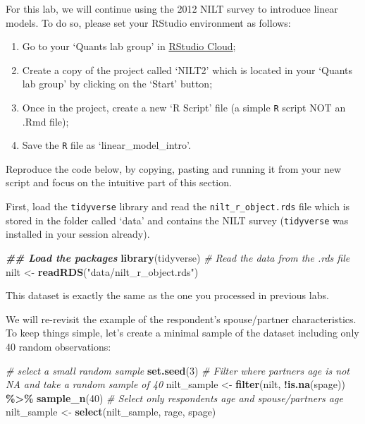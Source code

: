 \documentclass[
]{book}
\newenvironment{Shaded}{\begin{snugshade}}{\end{snugshade}}
\newcommand{\CommentTok}[1]{\textcolor[rgb]{0.56,0.35,0.01}{\textit{#1}}}
\newcommand{\DecValTok}[1]{\textcolor[rgb]{0.00,0.00,0.81}{#1}}
\newcommand{\DocumentationTok}[1]{\textcolor[rgb]{0.56,0.35,0.01}{\textbf{\textit{#1}}}}
\newcommand{\FunctionTok}[1]{\textcolor[rgb]{0.13,0.29,0.53}{\textbf{#1}}}
\newcommand{\NormalTok}[1]{#1}
\newcommand{\OtherTok}[1]{\textcolor[rgb]{0.56,0.35,0.01}{#1}}
\newcommand{\SpecialCharTok}[1]{\textcolor[rgb]{0.81,0.36,0.00}{\textbf{#1}}}
\newcommand{\StringTok}[1]{\textcolor[rgb]{0.31,0.60,0.02}{#1}}
\providecommand{\tightlist}{%
  \setlength{\itemsep}{0pt}\setlength{\parskip}{0pt}}
\begin{document}
For this lab, we will continue using the 2012 NILT survey to introduce linear models. To do so, please set your RStudio environment as follows:

\begin{enumerate}
\def\labelenumi{\arabic{enumi}.}
\tightlist
\item
  Go to your `Quants lab group' in \href{https://rstudio.cloud/}{RStudio Cloud};
\item
  Create a copy of the project called `NILT2' which is located in your `Quants lab group' by clicking on the `Start' button;
\item
  Once in the project, create a new `R Script' file (a simple \texttt{R} script NOT an .Rmd file);
\item
  Save the \texttt{R} file as `linear\_model\_intro'.
\end{enumerate}

Reproduce the code below, by copying, pasting and running it from your new script and focus on the intuitive part of this section.

First, load the \texttt{tidyverse} library and read the \texttt{nilt\_r\_object.rds} file which is stored in the folder called `data' and contains the NILT survey (\texttt{tidyverse} was installed in your session already).

\begin{Shaded}
\begin{Highlighting}[]
\DocumentationTok{\#\# Load the packages}
\FunctionTok{library}\NormalTok{(tidyverse)}
\CommentTok{\# Read the data from the .rds file}
\NormalTok{nilt }\OtherTok{\textless{}{-}} \FunctionTok{readRDS}\NormalTok{(}\StringTok{"data/nilt\_r\_object.rds"}\NormalTok{)}
\end{Highlighting}
\end{Shaded}

This dataset is exactly the same as the one you processed in previous labs.

We will re-revisit the example of the respondent's spouse/partner characteristics. To keep things simple, let's create a minimal sample of the dataset including only 40 random observations:

\begin{Shaded}
\begin{Highlighting}[]
\CommentTok{\# select a small random sample}
\FunctionTok{set.seed}\NormalTok{(}\DecValTok{3}\NormalTok{)}
\CommentTok{\# Filter where partner\textquotesingle{}s age is not NA and take a random sample of 40}
\NormalTok{nilt\_sample }\OtherTok{\textless{}{-}} \FunctionTok{filter}\NormalTok{(nilt, }\SpecialCharTok{!}\FunctionTok{is.na}\NormalTok{(spage)) }\SpecialCharTok{\%\textgreater{}\%} \FunctionTok{sample\_n}\NormalTok{(}\DecValTok{40}\NormalTok{)}
\CommentTok{\# Select only respondent\textquotesingle{}s age and spouse/partner\textquotesingle{}s age}
\NormalTok{nilt\_sample }\OtherTok{\textless{}{-}} \FunctionTok{select}\NormalTok{(nilt\_sample, rage, spage)}
\end{Highlighting}
\end{Shaded}
\end{document}
